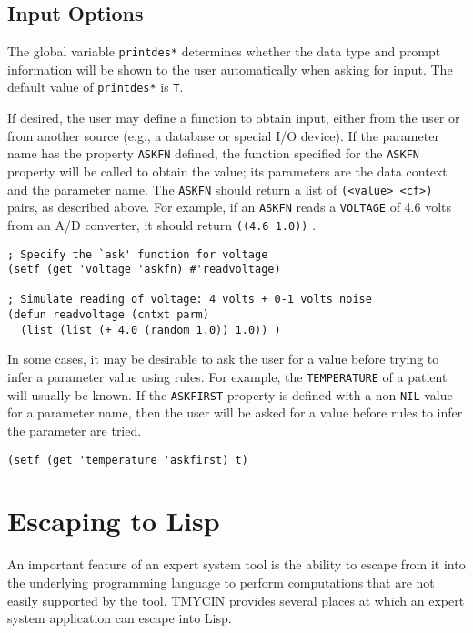 \subsection{Input Options}

The global variable {\tt *printdes*} determines whether the data type and
prompt information will be shown to the user automatically when asking for
input.  The default value of {\tt *printdes*} is {\tt T}.

If desired, the user may define a function to obtain input, either
from the user or from another source (e.g., a database or special I/O
device).  If the parameter name has the property {\tt ASKFN} defined,
the function specified for the {\tt ASKFN} property will be called to
obtain the value; its parameters are the data context and the
parameter name.  The {\tt ASKFN} should return a list of
{\tt (<value>\ <cf>)} pairs, as described above.  For example, if an
{\tt ASKFN} reads a {\tt VOLTAGE} of 4.6 volts from an A/D converter, it
should return {\tt ((4.6\ 1.0))} .

\begin{verbatim}
; Specify the `ask' function for voltage
(setf (get 'voltage 'askfn) #'readvoltage)

; Simulate reading of voltage: 4 volts + 0-1 volts noise
(defun readvoltage (cntxt parm)
  (list (list (+ 4.0 (random 1.0)) 1.0)) )
\end{verbatim}

In some cases, it may be desirable to ask the user for a value before
trying to infer a parameter value using rules.  For example, the
{\tt TEMPERATURE} of a patient will usually be known.  If the
{\tt ASKFIRST} property is defined with a non-{\tt NIL} value for a
parameter name, then the user will be asked for a value before rules
to infer the parameter are tried.

\begin{verbatim}
(setf (get 'temperature 'askfirst) t)
\end{verbatim}

\section{Escaping to Lisp}

An important feature of an expert system tool is the ability to escape from it
into the underlying programming language to perform computations that are not
easily supported by the tool.  TMYCIN provides several places at which an
expert system application can escape into Lisp.

